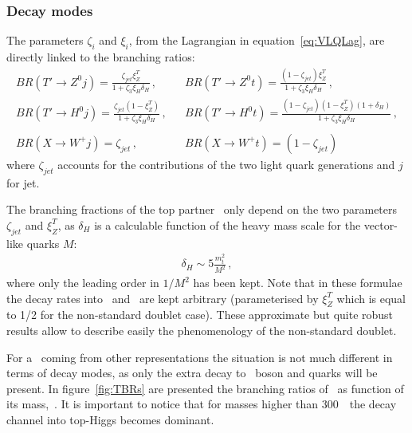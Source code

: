 \subsubsection{Decay modes}
\label{sec:decay}

The parameters $\zeta_{i}$ and $\xi_i$, from the Lagrangian in equation~\ref{eq:VLQLag}, are directly linked to the branching ratios:
 \begin{eqnarray} 
BR (T' \to Z^{0} j) = \frac{\zeta_{jet} \xi^T_Z}{1+\zeta_3 \xi_H \delta_H}\,, & & BR (T' \to Z^{0} t) = \frac{(1-\zeta_{jet}) \xi^T_Z}{1+\zeta_3 
\xi_H \delta_H}\,,\\
BR(T' \to H^{0} j) = \frac{\zeta_{jet} (1-\xi^T_Z)}{1+\zeta_3 \xi_H \delta_H}\,, & &  BR(T' \to H^{0} t) = \frac{(1-\zeta_{jet})
(1-\xi^T_Z) (1+\delta_H)}{1+\zeta_3 \xi_H \delta_H}\,, \nonumber\\
 & & \nonumber \\
BR(X \to W^{+} j) = \zeta_{jet}\,, & & BR(X \to W^{+} t) = (1-\zeta_{jet})
 \end{eqnarray} where $\zeta_{jet}$ accounts for the contributions of the two light quark generations and $j$ for jet.

The branching fractions of the top partner \Tp~only depend on the two parameters $\zeta_{jet}$ and $\xi_Z^{T}$, as $\delta_H$ is a calculable function of the heavy mass scale for the vector-like quarks $M$:
\begin{eqnarray} 
\delta_H  \sim 5 \frac{m^2_t}{M^2}\,, \label{eq:deltaH}
\end{eqnarray} 
where only the leading order in $1/M^2$ has been kept. Note that in these formulae the decay rates into \Z~and \Hb~are kept arbitrary (parameterised by $\xi_Z^{T}$ which is equal to 1/2 for the non-standard doublet case). These approximate but quite robust results allow to describe easily the phenomenology of the non-standard doublet. 

For a \Tp~coming from other representations the situation is not much different in terms of decay modes, as only the extra decay to \W~boson and quarks will be present. In figure~\ref{fig:TBRs} are presented the branching ratios of \Tp~as function of its mass,~\cite{Cacciapaglia:2011fx}. It is important to notice that for masses higher than 300~\GeVcc~the decay channel into top-Higgs becomes dominant.

